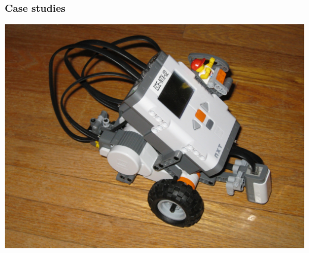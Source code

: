 \begin{frame}
\frametitle{Case studies}

\begin{center}
\includegraphics[width=.9\textwidth]{images/tribot}
\end{center}

\end{frame}

